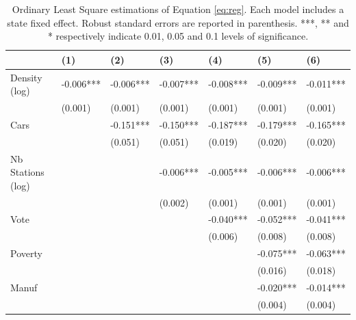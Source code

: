 \documentclass[10pt]{article}
\begin{document}
\begin{table}[h]
\caption{Ordinary Least Square estimations of Equation \ref{eq:reg}. Each model includes a state fixed effect. Robust standard errors are reported in parenthesis. ***, ** and * respectively indicate 0.01, 0.05 and 0.1 levels of significance.\label{tab:reg}}

\begin{tabular*}{\hsize}{@{\extracolsep{\fill}}lllllll@{}}
\toprule
  & (1) & (2) & (3) & (4) & (5) & (6) \\ 
\midrule
Density (log)&      -0.006***&      -0.006***&      -0.007***&      -0.008***&      -0.009***&      -0.011***\\
            &     (0.001)   &     (0.001)   &     (0.001)   &     (0.001)   &     (0.001)   &     (0.001)   \\

Cars       &               &      -0.151***&      -0.150***&      -0.187***&      -0.179***&      -0.165***\\
            &               &     (0.051)   &     (0.051)   &     (0.019)   &     (0.020)   &     (0.020)   \\

Nb Stations (log) &               &               &      -0.006***&      -0.005***&      -0.006***&      -0.006***\\
            &               &               &     (0.002)   &     (0.001)   &     (0.001)   &     (0.001)   \\

Vote       &               &               &               &      -0.040***&      -0.052***&      -0.041***\\
            &               &               &               &     (0.006)   &     (0.008)   &     (0.008)   \\

Poverty      &               &               &               &               &      -0.075***&      -0.063***\\
            &               &               &               &               &     (0.016)   &     (0.018)   \\

Manuf      &               &               &               &               &      -0.020***&      -0.014***\\
            &               &               &               &               &     (0.004)   &     (0.004)   \\


\end{tabular*}
\end{table}
\end{document}
